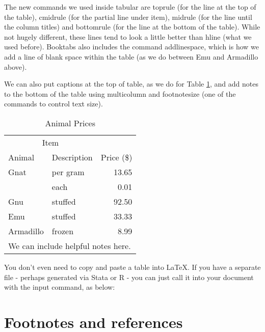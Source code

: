\documentclass{article}
\begin{document}
The new commands we used inside tabular are toprule (for the line at the top of the table), cmidrule (for the partial line under item), midrule (for the line until the column titles) and bottomrule (for the line at the bottom of the table). While not hugely different, these lines tend to look a little better than hline (what we used before). Booktabs also includes the command addlinespace, which is how we add a line of blank space within the table (as we do between Emu and Armadillo above).
\clearpage

We can also put captions at the top of table, as we do for Table \ref{tab:animal}, and add notes to the bottom of the table using multicolumn and footnotesize (one of the commands to control text size).

\begin{table}[h!]
	\centering
	\caption{Animal Prices}\label{tab:animal}
	\begin{tabular}{llr} \toprule
		\multicolumn{2}{c}{Item} \\ \cmidrule(r){1-2}
		Animal & Description & Price (\$)\\ \midrule
		Gnat & per gram & 13.65 \\
		& each & 0.01 \\
		Gnu & stuffed & 92.50 \\
		Emu & stuffed & 33.33 \\ \addlinespace
		Armadillo & frozen & 8.99 \\ \midrule
		\multicolumn{3}{l}{\footnotesize We can include helpful notes here.} \\
		\bottomrule
	\end{tabular}
	\centering
\end{table}

You don't even need to copy and paste a table into \LaTeX. If you have a separate file - perhaps generated via Stata or R - you can just call it into your document with the input command, as below:



\clearpage
\section{Footnotes and references}
\end{document}
